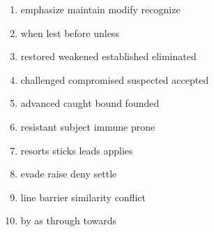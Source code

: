 \newpage

\begin{enumerate}
	\item


\fourchoices
{emphasize}
{maintain}
{modify}
{recognize}




\item


\fourchoices
{when}
{lest}
{before}
{unless}




\item


\fourchoices
{restored}
{weakened}
{established}
{eliminated}




\item


\fourchoices
{challenged}
{compromised}
{suspected}
{accepted}




\item


\fourchoices
{advanced}
{caught}
{bound}
{founded}




\item


\fourchoices
{resistant}
{subject}
{immune}
{prone}




\item


\fourchoices
{resorts}
{sticks}
{leads}
{applies}




\item


\fourchoices
{evade}
{raise}
{deny}
{settle}




\item


\fourchoices
{line}
{barrier}
{similarity}
{conflict}




\item


\fourchoices
{by}
{as}
{through}
{towards}





\end{enumerate}
